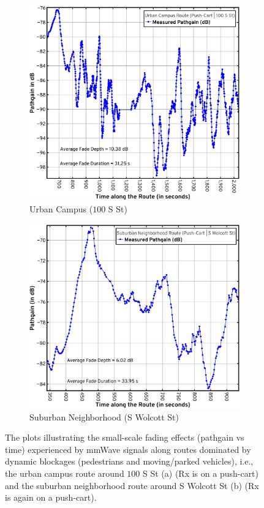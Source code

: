 \documentclass[12pt, draftcls, onecolumn]{IEEEtran}
\begin{document}
{\begin{figure} [t]
\begin{subfigure}{0.482\linewidth}
        \includegraphics[width=1.0\linewidth]{figs/urban_campus_pathgain_vs_time.pdf}
        \caption{Urban Campus ($100$ S St)}
        \label{F10a}
    \end{subfigure}
    \begin{subfigure}{0.508\linewidth}
        \centering
        \includegraphics[width=1.0\linewidth]{figs/suburban_pathgain_vs_time.pdf}
        \caption{Suburban Neighborhood (S Wolcott St)}
        \label{F10b}
    \end{subfigure}
    \vspace{-8mm}
    \caption{The plots illustrating the small-scale fading effects (pathgain vs time) experienced by mmWave signals along routes dominated by dynamic blockages (pedestrians and moving/parked vehicles), i.e., the urban campus route around $100$ S St (a) (Rx is on a push-cart) and the suburban neighborhood route around S Wolcott St (b) (Rx is again on a push-cart).}
    \label{F10}
\end{figure}
\vspace{-3mm}

}
\end{document}
